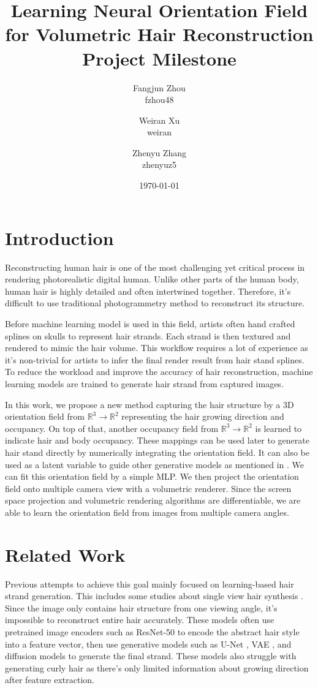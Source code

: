 \documentclass[12pt]{article}
\title{
Learning Neural Orientation Field for Volumetric Hair Reconstruction \\
{
\small
Project Milestone
}
}
\author{
Fangjun Zhou \\ fzhou48
\and Weiran Xu \\ weiran
\and Zhenyu Zhang \\ zhenyuz5
}
\date{\today}
\begin{document}
\maketitle

\section{Introduction}

Reconstructing human hair is one of the most challenging yet critical process in rendering photorealistic digital human. Unlike other parts of the human body, human hair is highly detailed and often intertwined together. Therefore, it's difficult to use traditional photogrammetry method to reconstruct its structure.

Before machine learning model is used in this field, artists often hand crafted splines on skulls to represent hair strands. Each strand is then textured and rendered to mimic the hair volume. This workflow requires a lot of experience as it's non-trivial for artists to infer the final render result from hair stand splines. To reduce the workload and improve the accuracy of hair reconstruction, machine learning models are trained to generate hair strand from captured images.

In this work, we propose a new method capturing the hair structure by a 3D orientation field from $\mathbb{R}^{3} \rightarrow \mathbb{R}^{2}$ representing the hair growing direction and occupancy. On top of that, another occupancy field from $\mathbb{R}^{3} \rightarrow \mathbb{R}^{2}$ is learned to indicate hair and body occupancy. These mappings can be used later to generate hair stand directly by numerically integrating the orientation field. It can also be used as a latent variable to guide other generative models as mentioned in \cite{metzer_latent-nerf_2022}. We can fit this orientation field by a simple MLP. We then project the orientation field onto multiple camera view with a volumetric renderer. Since the screen space projection and volumetric rendering algorithms are differentiable, we are able to learn the orientation field from images from multiple camera angles.

\section{Related Work}

Previous attempts to achieve this goal mainly focused on learning-based hair strand generation. This includes some studies about single view hair synthesis \cite{saito_3d_2018, zheng_hairstep_2023, wu_neuralhdhair_2022, ma_single-view_nodate}. Since the image only contains hair structure from one viewing angle, it's impossible to reconstruct entire hair accurately. These models often use pretrained image encoders such as ResNet-50 \cite{saito_3d_2018} to encode the abstract hair style into a feature vector, then use generative models such as U-Net \cite{zheng_hairstep_2023}, VAE \cite{saito_3d_2018}, and diffusion models \cite{sklyarova_neural_2023} to generate the final strand. These models also struggle with generating curly hair as there's only limited information about growing direction after feature extraction.
\end{document}
